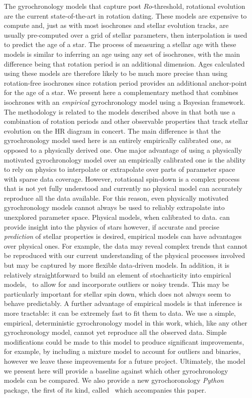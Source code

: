 The gyrochronology models that capture post $Ro$-threshold, rotational
evolution \citep{vansaders2016} are the current state-of-the-art in rotation
dating.
These models are expensive to compute and, just as with most isochrones and
stellar evolution tracks, are usually pre-computed over a grid of stellar
parameters, then interpolation is used to predict the age of a star.
The process of measuring a stellar age with these models is similar to
inferring an age using any set of isochrones, with the main difference being
that rotation period is an additional dimension.
Ages calculated using these models are therefore likely to be much more
precise than using rotation-free isochrones since rotation period provides an
additional anchor-point for the age of a star.
We present here a complementary method that combines isochrones with an {\it
empirical} gyrochronology model using a Bayesian framework.
The methodology is related to the models described above \citep{vansaders2016}
in that both use a combination of rotation periods and other observable
properties that track stellar evolution on the HR diagram in concert.
The main difference is that the gyrochronology model used here is an entirely
empirically calibrated one, as opposed to a physically derived one.
One major advantage of using a physically motivated gyrochronology model over
an empirically calibrated one is the ability to rely on physics to interpolate
or extrapolate over parts of parameter space with sparse data coverage.
However, rotational spin-down is a complex process that is not yet fully
understood and currently no physical model can accurately reproduce all the
data available.
For this reason, even physically motivated gyrochronology models cannot always
be used to reliably extrapolate into unexplored parameter space.
Physical models, when calibrated to data. can provide insight into the physics
of stars however, if accurate and precise {\it prediction} of stellar
properties is desired, empirical models can have advantages over physical
ones.
For example, the data may reveal complex trends that cannot be reproduced with
our current understanding of the physical processes involved but may be
captured by more flexible data-driven models.
In addition, it is relatively straightforward to build an element of
stochasticity into empirical models, \ie\ to allow for and incorporate
outliers or noisy trends.
This may be particularly important for stellar spin down, which does not
always seem to behave predictably.
A further advantage of empirical models is that inference is more tractable:
it can be extremely fast to fit them to data.
We use a simple, empirical, deterministic gyrochronology model in this work,
which, like any other gyrochronology model, cannot yet reproduce all the
observed data.
Simple modifications could be made to this model to produce significant
improvements, for example, by including a mixture model to account for
outliers and binaries, however we leave these improvements for a future
project.
Ultimately, the model we present here will provide a baseline against which
other gyrochronology models can be compared.
We also provide a new gyrochoronology {\it Python} package, the first of its
kind, called \sd\ which accompanies this paper.

